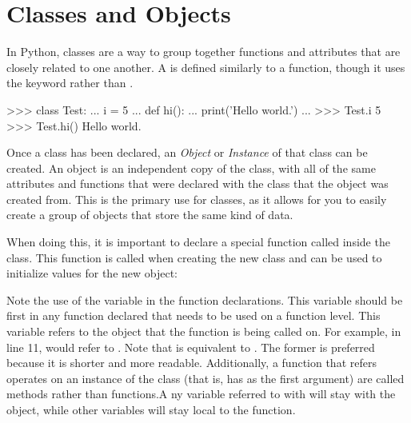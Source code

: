\documentclass[11pt]{cselabheader}
\begin{document}
\section{Classes and Objects}
\label{sec:classes}
In Python, classes are a way to group together functions and attributes
that are closely related to one another. A  is defined
similarly to a function, though it uses the  keyword rather
than .

\begin{pyconcode}
>>> class Test:
...     i = 5
...     def hi():
...         print('Hello world.')
...
>>> Test.i
5
>>> Test.hi()
Hello world.
\end{pyconcode}

Once a class has been declared, an \emph{Object} or
\emph{Instance} of that class can be created. An object is an independent
copy of the class, with all of the same attributes and functions that were
declared with the class that the object was created from. This is the
primary use for classes, as it allows for you to easily create a group of
objects that store the same kind of data.

When doing this, it is important to declare a special function called
 inside the class. This function is called when
creating the new class and can be used to initialize values for the
new object:


Note the use of the variable  in the function declarations.
This variable should be first in any function declared that needs to be used on
a function level. This variable refers to the object that the function is
being called on. For example, in line 11,  would refer to
. Note that  is equivalent to
. The former is preferred because it is shorter
and more readable. Additionally, a function that refers operates on an instance
of the class (that is, has  as the first argument) are called
methods rather than functions.A ny variable referred to with
 will stay with the object, while other
variables will stay local to the function.
\end{document}
